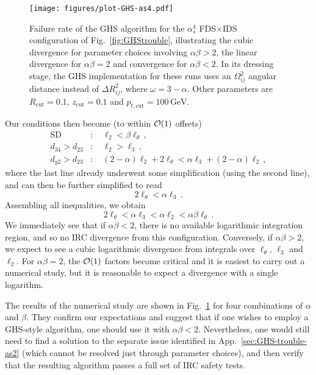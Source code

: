 \documentclass[nofootinbib,twocolumn,preprintnumbers,superscriptaddress,aps]{revtex4-2}
\newcommand{\as}{\alpha_s}
\newcommand{\order}[1]{{\cal O}\!\left(#1\right)}
\newcommand{\GeV}{\,\text{GeV}}
\begin{document}
\begin{figure}
  \centering
  \texttt{[image: figures/plot-GHS-as4.pdf]}
  \caption{Failure rate of the GHS algorithm   for the $\as^4$
    FDS$\times$IDS configuration of Fig.~\ref{fig:GHStrouble},
    illustrating the cubic divergence for parameter choices involving
    $\alpha\beta>2$, the linear divergence for $\alpha\beta=2$ and
    convergence for $\alpha\beta<2$.
    In its dressing stage, the GHS implementation for these runs uses an
    $\Omega_{ij}^2$ angular distance instead of
    $\Delta R_{ij}^2$, where $\omega=3-\alpha$.
    Other parameters are $R_\text{cut}=0.1$,
    $z_\text{cut}=0.1$ and $p_{t,\text{cut}}=100\GeV$.
  }
  \label{fig:GHS-DSDS-tests}
\end{figure}

Our conditions then become (to within $\order{1}$ offsets)
\begin{subequations}
  \begin{align}
    \text{SD}&:\quad \ell_2 < \beta \ell_\theta\,,
    \\
    d_{34} > d_{23}&:\quad\ell_2 > \ell_3\,,
    \\
    d_{g2} > d_{23}&:\quad (2-\alpha)\ell_2 +2\ell_\theta < \alpha
                     \ell_3 + (2-\alpha)\ell_2\,,
                     \label{eq:GHS-DSDS-dg2-d23-full}
  \end{align}
\end{subequations}
where the last line already underwent some simplification (using the
second line), and can then be further simplified to read
\begin{equation}
  2\ell_\theta < \alpha \ell_3\,.
\end{equation}
Assembling all inequalities, we obtain
\begin{equation}
  \label{eq:eq:GHS-DSDS-conditions}
  2 \ell_\theta < \alpha \ell_3 < \alpha \ell_2 < \alpha \beta \ell_\theta\,.
\end{equation}
We immediately see that if $\alpha \beta < 2$, there is no available
logarithmic integration region, and so no IRC divergence from this
configuration.
%
Conversely, if $\alpha \beta > 2$, we expect to see a cubic
logarithmic divergence from integrals over $\ell_\theta$, $\ell_3$
and $\ell_2$.
%
For $\alpha \beta = 2$, the $\order{1}$ factors become critical and it
is easiest to carry out a numerical study, but it is reasonable to
expect a divergence with a single logarithm.

The results of the numerical study are shown in
Fig.~\ref{fig:GHS-DSDS-tests} for four combinations of $\alpha$ and
$\beta$.
%
They confirm our expectations and suggest that if one wishes to employ
a GHS-style algorithm, one should use it with $\alpha\beta < 2$.
%
Nevertheless, one would still need to find a solution to the separate
issue identified in App.~\ref{sec:GHS-trouble-as2} (which cannot be
resolved just through parameter choices), and then verify that the
resulting algorithm passes a full set of IRC safety tests.
\end{document}
